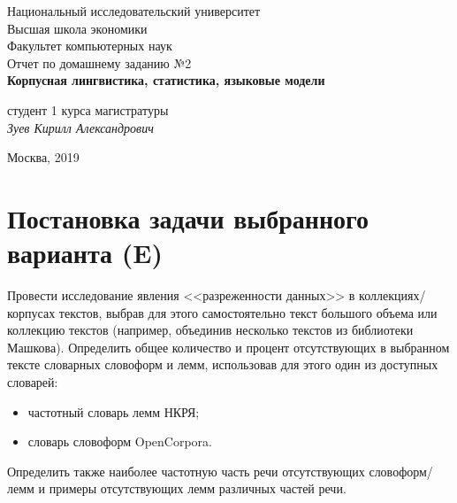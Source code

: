 \documentclass[oneside,final,12pt]{article}
\begin{document}
\begin{titlepage}
\begin{center}

    Национальный исследовательский университет\\
    Высшая школа экономики\\
    Факультет компьютерных наук\\[60mm]
    \bigskip
    Отчет по домашнему заданию №2 \\[5mm]   
    \textsf{\large\bfseries
        Корпусная лингвистика, статистика, языковые модели
    }\\[50mm]

   
    \begin{flushright}
        \parbox{0.4\textwidth}{
            студент 1 курса магистратуры\\
            \emph{Зуев Кирилл Александрович}\\[5mm]
        }
    \end{flushright}

    \vspace{\fill}
    Москва, 2019
\end{center}
\end{titlepage}

\newpage

\renewcommand{\contentsname}{Содержание}
\tableofcontents

\newpage

\section{Постановка задачи выбранного варианта (E)}

Провести исследование явления <<разреженности данных>> в коллекциях/корпусах текстов, выбрав для этого самостоятельно текст большого объема или коллекцию текстов (например, объединив несколько текстов из библиотеки Машкова). Определить общее количество и процент отсутствующих в выбранном тексте словарных словоформ и лемм, использовав для этого один из доступных словарей:

\begin{itemize}
	\item частотный словарь лемм НКРЯ;
	\item словарь словоформ OpenCorpora.
\end{itemize}

Определить также наиболее частотную часть речи отсутствующих словоформ/лемм и примеры отсутствующих лемм различных частей речи.
\end{document}
